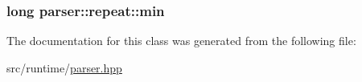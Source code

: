 \subsubsection[{\texorpdfstring{min}{min}}]{\setlength{\rightskip}{0pt plus 5cm}long parser\+::repeat\+::min\hspace{0.3cm}{\ttfamily [private]}}\hypertarget{classparser_1_1repeat_a4a52b46d6d8139c877b78454942c03fd}{}\label{classparser_1_1repeat_a4a52b46d6d8139c877b78454942c03fd}


The documentation for this class was generated from the following file\+:\begin{DoxyCompactItemize}
\item 
src/runtime/\hyperlink{parser_8hpp}{parser.\+hpp}\end{DoxyCompactItemize}
